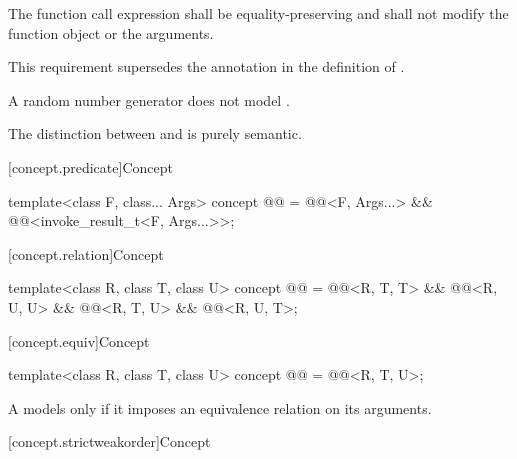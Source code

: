 \begin{itemdescr}
\pnum
The  function call expression shall be
equality-preserving and
shall not modify the function object or the arguments.
\begin{note}
This requirement supersedes the annotation in the definition of
.
\end{note}

\pnum
\begin{example}
A random number generator does not model .
\end{example}

\pnum
\begin{note}
The distinction between  and 
is purely semantic.
\end{note}
\end{itemdescr}

[concept.predicate]{Concept }

\begin{itemdecl}
template<class F, class... Args>
  concept @@ =
    @@<F, Args...> && @@<invoke_result_t<F, Args...>>;
\end{itemdecl}

[concept.relation]{Concept }

\begin{itemdecl}
template<class R, class T, class U>
  concept @@ =
    @@<R, T, T> && @@<R, U, U> &&
    @@<R, T, U> && @@<R, U, T>;
\end{itemdecl}

[concept.equiv]{Concept }

\begin{itemdecl}
template<class R, class T, class U>
  concept @@ = @@<R, T, U>;
\end{itemdecl}

\begin{itemdescr}
\pnum
A  models  only if
it imposes an equivalence relation on its arguments.
\end{itemdescr}

[concept.strictweakorder]{Concept }

